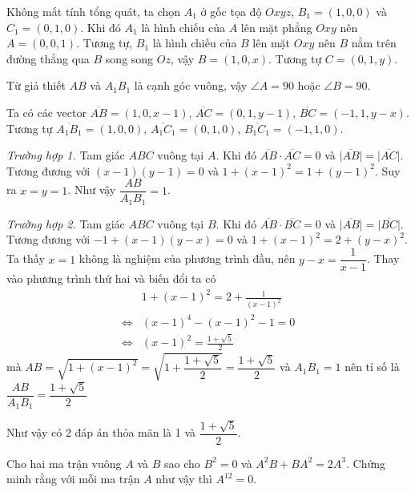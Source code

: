 \begin{solution}
    Không mất tính tổng quát, ta chọn $A_1$ ở gốc tọa độ $Oxyz$, 
    $B_1 = (1, 0, 0)$ và $C_1 = (0, 1, 0)$. Khi đó $A_1$ là hình
    chiếu của $A$ lên mặt phẳng $Oxy$ nên $A = (0, 0, 1)$. Tương
    tự, $B_1$ là hình chiếu của $B$ lên mặt $Oxy$ nên $B$ nằm
    trên đường thẳng qua $B$ song song $Oz$, vậy $B = (1, 0, x)$.
    Tương tự $C = (0, 1, y)$.

    Từ giả thiết $AB$ và $A_1 B_1$ là cạnh góc vuông, vậy $\angle A = 90$
    hoặc $\angle B = 90$.

    Ta có các vector $\overline{AB} = (1, 0, x-1)$, $\overline{AC} = (0, 1, y-1)$,
    $\overline{BC} = (-1, 1, y-x)$.
    Tương tự $\overline{A_1 B_1} = (1, 0, 0)$, $\overline{A_1 C_1} = (0, 1, 0)$,
    $\overline{B_1 C_1} = (-1, 1, 0)$.

    \textit{Trường hợp 1.} Tam giác $ABC$ vuông tại $A$. Khi đó
    $\overline{AB} \cdot \overline{AC} = 0$ và $\lvert \overline{AB}
    \rvert = \lvert \overline{AC} \rvert$. Tương đương với $(x-1)(y-1) = 0$
    và $1 + (x-1)^2 = 1 + (y-1)^2$. Suy ra $x = y = 1$. Như vậy 
    $\dfrac{AB}{A_1 B_1} = 1$.

    \textit{Trường hợp 2.} Tam giác $ABC$ vuông tại $B$. Khi đó
    $\overline{AB} \cdot \overline{BC} = 0$ và $\lvert \overline{AB} \rvert
    = \lvert \overline{BC} \rvert$. Tương đương với $-1 + (x-1)(y-x) = 0$
    và $1 + (x-1)^2 = 2 + (y-x)^2$. Ta thấy $x = 1$ không là nghiệm
    của phương trình đầu, nên $y - x = \dfrac{1}{x-1}$. Thay vào phương
    trình thứ hai và biến đổi ta có
    \begin{align*}
        & 1 + (x-1)^2 = 2 + \frac{1}{(x-1)^2} \\ 
        \Leftrightarrow & (x-1)^4 - (x-1)^2 - 1 = 0 \\ 
        \Leftrightarrow & (x-1)^2 = \frac{1+\sqrt{5}}{2}
    \end{align*}
    mà $AB = \sqrt{1 + (x-1)^2} = \sqrt{1 + \dfrac{1 + \sqrt{5}}{2}}
    = \dfrac{1 + \sqrt{5}}{2}$ và $A_1 B_1 = 1$ nên tỉ số là 
    $\dfrac{AB}{A_1 B_1} = \dfrac{1 + \sqrt{5}}{2}$

    Như vậy có 2 đáp án thỏa mãn là 1 và $\dfrac{1 + \sqrt{5}}{2}$.
\end{solution}

\begin{problem}[Bài 7]
    Cho hai ma trận vuông $A$ và $B$ sao cho $B^2 = 0$ và
    $A^2 B + B A^2 = 2A^3$. Chứng minh rằng với mỗi ma trận
    $A$ như vậy thì $A^{12} = 0$.
\end{problem}

